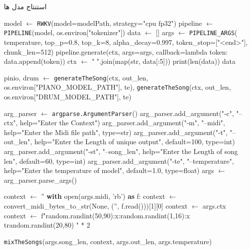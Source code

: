 \begin{LTR}
      \begin{algorithm}[H]
            \caption{استنتاج مدل ها}
            \label{algo:infer}
            \begin{algorithmic}[1]
                  \setmainfont{Times New Roman}
                  \State model $\gets$ \texttt{RWKV}(model=modelPath, strategy="cpu fp32")
                  \State pipeline $\gets$ \texttt{PIPELINE}(model, os.environ["tokenizer"])
                  \State data $\gets$ []
                  \State args $\gets$ \texttt{PIPELINE\_ARGS}(
                  temperature, top\_p=0.8, top\_k=8, alpha\_decay=0.997, token\_stop=["<end>"], chunk\_len=512)
                  \State pipeline.generate(ctx, args=args, callback=lambda token: data.append(token))
                  \State ctx $\gets$ " ".join(map(str, data[:5]))
                  \State print(len(data))
                  \EndWhile
                  \State \Return data
                  \EndFunction

                  \State pinio, drum $\gets$ \texttt{generateTheSong}(ctx, out\_len, os.environ["PIANO\_MODEL\_PATH"], te), \texttt{generateTheSong}(ctx, out\_len, os.environ["DRUM\_MODEL\_PATH"], te)
                  \EndFunction

                  \Statex

                  \State arg\_parser $\gets$ \texttt{argparse.ArgumentParser}()
                  \State arg\_parser.add\_argument("-c", "--ctx", help="Enter the Context")
                  \State arg\_parser.add\_argument("-m", "--midi", help="Enter the Midi file path", type=str)
                  \State arg\_parser.add\_argument("-t", "--out\_len", help="Enter the Length of unique output", default=100, type=int)
                  \State arg\_parser.add\_argument("-st", "--song\_len", help="Enter the Length of song len", default=60, type=int)
                  \State arg\_parser.add\_argument("-te", "--temperature", help="Enter the temperature of model", default=1.0, type=float)
                  \State args $\gets$ arg\_parser.parse\_args()

                  \State context $\gets$ ''
                  \State \textbf{with} open(args.midi, 'rb') \textbf{as} f:
                  \State context $\gets$ convert\_midi\_bytes\_to\_str(None, ('', f.read()))[1][0]
                  \State context $\gets$ args.ctx
                  \Else
                  \State context $\gets$ f"{random.randint(50,90):x}:{random.randint(1,16):x} t{random.randint(20,80)} " * 2
                  \EndIf

                  \State \texttt{mixTheSongs}(args.song\_len, context, args.out\_len, args.temperature)
            \end{algorithmic}
      \end{algorithm}
\end{LTR}

